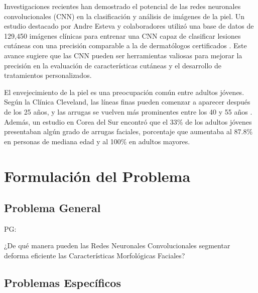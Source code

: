 Investigaciones recientes han demostrado el potencial de las redes neuronales convolucionales (CNN) en la clasificación y análisis de imágenes de la piel. Un estudio destacado por Andre Esteva y colaboradores utilizó una base de datos de 129,450 imágenes clínicas para entrenar una CNN capaz de clasificar lesiones cutáneas con una precisión comparable a la de dermatólogos certificados . Este avance sugiere que las CNN pueden ser herramientas valiosas para mejorar la precisión en la evaluación de características cutáneas y el desarrollo de tratamientos personalizados. \parencite{clevelandclinic2023}

El envejecimiento de la piel es una preocupación común entre adultos jóvenes. Según la Clínica Cleveland, las líneas finas pueden comenzar a aparecer después de los 25 años, y las arrugas se vuelven más prominentes entre los 40 y 55 años . Además, un estudio en Corea del Sur encontró que el 33\% de los adultos jóvenes presentaban algún grado de arrugas faciales, porcentaje que aumentaba al 87.8\% en personas de mediana edad y al 100\% en adultos mayores. \parencite{lee2008}

\section{Formulación del Problema}

\subsection{Problema General}
PG: \newcommand{\ProblemaGeneral}{
¿De qué manera pueden las Redes Neuronales Convolucionales segmentar deforma eficiente las Características Morfológicas Faciales?
}
\ProblemaGeneral

\subsection{Problemas Específicos}
\newcommand{\Pbone}{
¿De qué fuentes se obtendrán los datos necesarios para el entrenamiento y la validación del sistema de segmentación?
}
\newcommand{\Pbtwo}{
¿Cuáles serán las etapas y métodos para el desarrollo del sistema de segmentación basado en Redes Neuronales Convolucionales?
}
\newcommand{\Pbthree}{
¿Qué métricas, procedimientos y criterios se emplearán para evaluar la eficiencia y seleccionar el modelo de segmentación más adecuado en la detección de arrugas y manchas faciales?
}
\newcommand{\Pbfour}{
¿Cómo se implementará un sistema de segmentación morfológica facial en tiempo real utilizando redes neuronales convolucionales con mecanismos de atención?
}

